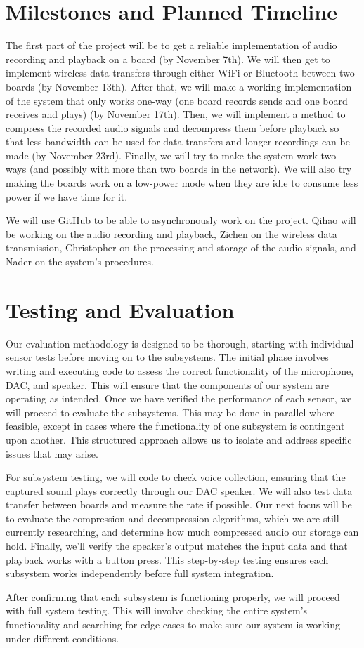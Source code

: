 \documentclass[journal]{IEEEtran}
\begin{document}
\section{Milestones and Planned Timeline}
The first part of the project will be to get a reliable implementation of audio recording and playback on a board (by November 7th). We will then get to implement wireless data transfers through either WiFi or Bluetooth between two boards (by November 13th). After that, we will make a working implementation of the system that only works one-way (one board records sends and one board receives and plays) (by November 17th). Then, we will implement a method to compress the recorded audio signals and decompress them before playback so that less bandwidth can be used for data transfers and longer recordings can be made (by November 23rd). Finally, we will try to make the system work two-ways (and possibly with more than two boards in the network). We will also try making the boards work on a low-power mode when they are idle to consume less power if we have time for it.

We will use GitHub to be able to asynchronously work on the project. Qihao will be working on the audio recording and playback, Zichen on the wireless data transmission, Christopher on the processing and storage of the audio signals, and Nader on the system's procedures.

\section{Testing and Evaluation}
Our evaluation methodology is designed to be thorough, starting with individual sensor tests before moving on to the subsystems. The initial phase involves writing and executing code to assess the correct functionality of the microphone, DAC, and speaker. This will ensure that the components of our system are operating as intended. Once we have verified the performance of each sensor, we will proceed to evaluate the subsystems. This may be done in parallel where feasible, except in cases where the functionality of one subsystem is contingent upon another. This structured approach allows us to isolate and address specific issues that may arise. 

For subsystem testing, we will code to check voice collection, ensuring that the captured sound plays correctly through our DAC speaker. We will also test data transfer between boards and measure the rate if possible. Our next focus will be to evaluate the compression and decompression algorithms, which we are still currently researching, and determine how much compressed audio our storage can hold. Finally, we'll verify the speaker's output matches the input data and that playback works with a button press. This step-by-step testing ensures each subsystem works independently before full system integration.

After confirming that each subsystem is functioning properly, we will proceed with full system testing. This will involve checking the entire system's functionality and searching for edge cases to make sure our system is working under different conditions.
\end{document}
